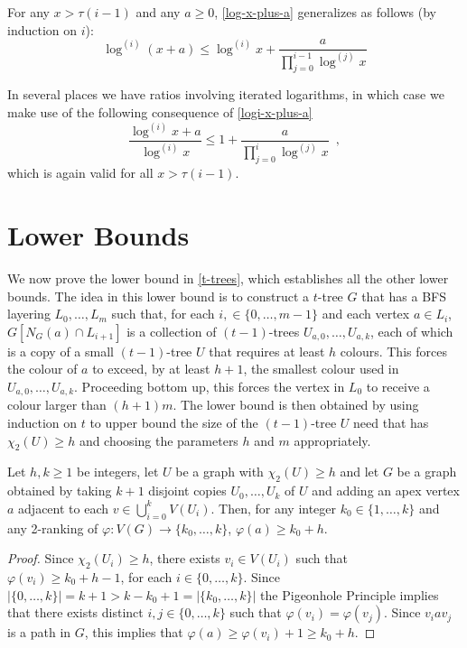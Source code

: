 \documentclass[kpfonts]{patmorin}
\newcommand{\trn}{\chi_2}
\theoremstyle{named}
\begin{document}
For any $x > \tau(i-1)$ and any $a\ge 0$, \cref{log-x-plus-a} generalizes as follows (by induction on $i$):
\begin{equation}
    \log^{(i)}(x+a) \le \log^{(i)} x + \frac{a}{\prod_{j=0}^{i-1}\log^{(j)} x} \label{logi-x-plus-a}
\end{equation}

In several places we have ratios involving iterated logarithms, in which case we make use of the following consequence of \cref{logi-x-plus-a}
\begin{equation}
    \frac{\log^{(i)} x+a}{\log^{(i)} x} \le 1 + \frac{a}{\prod_{j=0}^{i}\log^{(j)} x} \enspace, \label{logi-ratio}
\end{equation}
which is again valid for all $x> \tau(i-1)$.

\section{Lower Bounds}
\label{lower-bounds}

We now prove the lower bound in \cref{t-trees}, which establishes all the other lower bounds. The idea in this lower bound is to construct a $t$-tree $G$ that has a BFS layering $L_0,\ldots,L_m$ such that, for each $i,\in\{0,\ldots,m-1\}$ and each vertex $a\in L_i$, $G[N_G(a)\cap L_{i+1}]$ is a collection of $(t-1)$-trees $U_{a,0},\ldots,U_{a,k}$, each of which is a copy of a small $(t-1)$-tree $U$ that requires at least $h$ colours.  This forces the colour of $a$ to exceed, by at least $h+1$, the smallest colour used in $U_{a,0},\ldots,U_{a,k}$.  Proceeding bottom up, this forces the vertex in $L_0$ to receive a colour larger than $(h+1)m$.  The lower bound is then obtained by using induction on $t$ to upper bound the size of the $(t-1)$-tree $U$ need that has $\trn(U)\ge h$ and choosing the parameters $h$ and $m$ appropriately.

\begin{lem}\label{apex-graph}
    Let $h,k\ge 1$ be integers, let $U$ be a graph with $\trn(U)\ge h$ and let $G$ be a graph obtained by taking $k+1$ disjoint copies $U_0,\ldots,U_k$ of $U$ and adding an apex vertex $a$ adjacent to each $v\in\bigcup_{i=0}^k V(U_i)$.  Then, for any integer $k_0\in \{1,\ldots,k\}$ and any 2-ranking of $\varphi:V(G)\to\{k_0,\ldots,k\}$, $\varphi(a) \ge k_0+h$.
\end{lem}

\begin{proof}
    Since $\trn(U_i)\ge h$, there exists $v_i\in V(U_i)$ such that $\varphi(v_i)\ge k_0+h-1$, for each $i\in\{0,\ldots,k\}$.  Since $|\{0,\ldots,k\}|=k+1>k-k_0+1=|\{k_0,\ldots,k\}|$ the Pigeonhole Principle implies that there exists distinct $i,j\in\{0,\ldots,k\}$ such that $\varphi(v_i)=\varphi(v_j)$.  Since $v_i a v_j$ is a path in $G$, this implies that $\varphi(a)\ge \varphi(v_i)+1\ge k_0+h$.
\end{proof}
\end{document}
